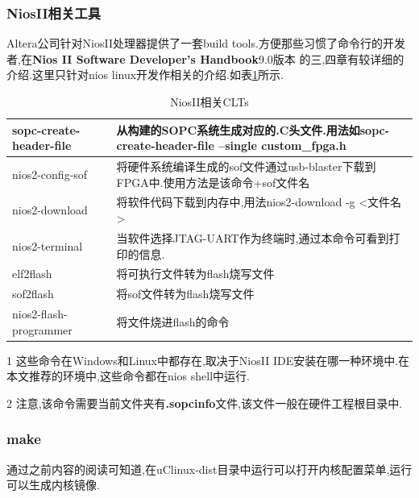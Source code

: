 \documentclass[12pt,a4paper,titlepage]{article}
\begin{document}
\subsubsection{NiosII相关工具}
Altera公司针对NiosII处理器提供了一套build tools.方便那些习惯了命令行的开发者,在\textbf{Nios II Software Developer's Handbook}9.0版本
的三,四章有较详细的介绍.这里只针对nios linux开发作相关的介绍.如表\ref{nios_clts}所示.
\begin{table}[!bthp]
\begin{threeparttable}
\centering
\begin{tabular}{|p{}|p{}|}
\hline
sopc-create-header-file\tnote{1} & 从构建的SOPC系统生成对应的.C头文件.用法如sopc-create-header-file --single custom\_fpga.h
\tnote{2}\\\hline
nios2-config-sof & 将硬件系统编译生成的sof文件通过usb-blaster下载到FPGA中.使用方法是该命令+sof文件名\\\hline
nios2-download & 将软件代码下载到内存中,用法nios2-download -g <文件名>\\\hline
nios2-terminal & 当软件选择JTAG-UART作为终端时,通过本命令可看到打印的信息.\\\hline
elf2flash & 将可执行文件转为flash烧写文件\\\hline
sof2flash & 将sof文件转为flash烧写文件\\\hline
nios2-flash-programmer & 将文件烧进flash的命令\\\hline
\end{tabular}
\caption{NiosII相关CLTs\label{nios_clts}}
\begin{tablenotes}
\footnotesize
\item[1] 这些命令在Windows和Linux中都存在,取决于NiosII IDE安装在哪一种环境中.在本文推荐的环境中,这些命令都在nios shell中运行.
\item[2] 注意,该命令需要当前文件夹有\textbf{.sopcinfo}文件,该文件一般在硬件工程根目录中.
\end{tablenotes}
\end{threeparttable}
\end{table}
\subsubsection{make}
通过之前内容的阅读可知道,在uClinux-dist目录中运行可以打开内核配置菜单,运行可以生成内核镜像.
\end{document}
